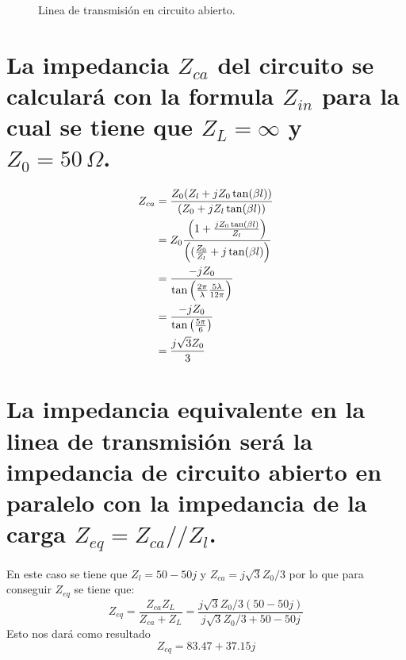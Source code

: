 \documentclass[
  11pt,
  letterpaper,
  answers
]{exam}
\begin{document}
\begin{questions}
\begin{figure}[ht]
    \caption{Linea de transmisión en circuito abierto.}
    \label{fig:lt}
  \end{figure}


\begin{solution}
\begin{parts}
\part{La impedancia $Z_{ca}$ del circuito se calculará con la formula $Z_{in}$ para la cual se tiene que $Z_L = \infty$ y $Z_0 = 50\,\Omega$.}

\begin{align}
  Z_{ca} &=\frac{Z_{0} (Z_{l}+ jZ_{0}\tan(\beta l))}{(Z_{0}+jZ_{l}\tan(\beta l))}\\
  &= Z_{0} \frac{\del{ 1 + \frac{jZ_{0}\tan(\beta l)}{Z_{l}}}}{\del{(\frac{Z_{0}}{Z_{l}} + j\tan(\beta l)}}\\
  &= \frac{-jZ_{0}}{\tan\del{\frac{2\pi}{\lambda} \frac{5\lambda}{12\pi}}}\\
  &= \frac{-jZ_{0}}{\tan\del{\frac{5\pi}{6}}}\\
  &= \frac{j \sqrt{3}Z_{0}}{3}
\end{align}
\part{La impedancia equivalente en la linea de transmisión será la impedancia de circuito abierto en paralelo con la impedancia de la carga $Z_{eq} = Z_{ca}//Z_{l}$.}
En este caso se tiene que $Z_{l} = 50-50j$ y $Z_{ca} = j \sqrt{3}Z_{0}/3$ por lo que para conseguir $Z_{eq}$ se tiene que:
\begin{equation}
  Z_{eq} = \frac{Z_{ca}Z_{L}}{Z_{ca}+Z_{L}} = \frac{j \sqrt{3}Z_{0}/3(50-50j)}{j \sqrt{3}Z_{0}/3+50-50j}
\end{equation}
Esto nos dará como resultado
\begin{equation}
  Z_{eq} = 83.47 + 37.15j
\end{equation}

\end{parts}
\end{solution}
\end{questions}
\end{document}

